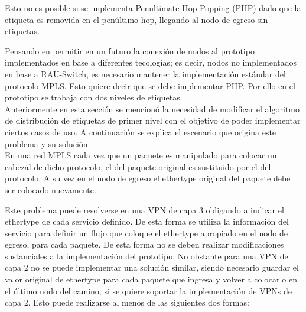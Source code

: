 Esto no es posible si se implementa Penultimate Hop Popping (PHP) dado que la etiqueta es removida en el pen\'ultimo hop, llegando al nodo de egreso sin etiquetas. 

Pensando en permitir en un futuro la conexi\'on de nodos al prototipo implementados en base a diferentes tecolog\'ias; es decir, nodos no implementados en base a RAU-Switch, es necesario mantener la implementaci\'on estándar del protocolo MPLS. Esto quiere decir que se debe implementar PHP. Por ello en el prototipo se trabaja con dos niveles de etiquetas.\\

Anteriormente en esta secci\'on se mencion\'o la necesidad de modificar el algoritmo de distribución de etiquetas de primer nivel con el objetivo de poder implementar ciertos casos de uso. A continuaci\'on se explica el escenario que origina este problema y su soluci\'on.\\

En una red MPLS cada vez que un paquete es manipulado para colocar un cabezal de dicho protocolo, el  del paquete original es sustituido por el del protocolo. A su vez en el nodo de egreso el ethertype original del paquete debe ser colocado nuevamente. 

Este problema puede resolverse en una VPN de capa 3 obligando a indicar el ethertype de cada servicio definido. De esta forma se utiliza la informaci\'on del servicio para definir un flujo que coloque el ethertype apropiado en el nodo de egreso, para cada paquete. De esta forma no se deben realizar modificaciones sustanciales a la implementaci\'on del prototipo. No obstante para una VPN de capa 2 no se puede implementar una soluci\'on similar, siendo necesario guardar el valor original de ethertype para cada paquete que ingresa y volver a colocarlo en el \'ultimo nodo del camino, si se quiere soportar la implementaci\'on de VPNs de capa 2. Esto puede realizarse al menos de las siguientes dos formas:

